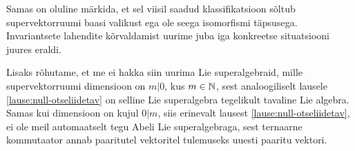 Samas on oluline märkida, et sel viisil
saadud klassifikatsioon sõltub supervektorruumi baasi valikust ega ole seega
isomorfismi täpsusega. Invariantsete lahendite kõrvaldamist uurime juba iga
konkreetse situatsiooni juures eraldi.

Lisaks rõhutame, et me ei hakka siin uurima Lie superalgebraid,
mille supervektorruumi dimensioon on $m|0$, kus $m \in \mathbb{N}$, sest
analoogiliselt lausele \ref{lause:null-otseliidetav} on selline Lie
superalgebra tegelikult tavaline Lie algebra. Samas kui dimensioon on
kujul $0|m$, siis erinevalt lausest \ref{lause:null-otseliidetav}, ei ole
meil automaatselt tegu Abeli Lie superalgebraga, sest ternaarne kommutaator
annab paaritutel vektoritel tulemuseks uuesti paaritu vektori.
